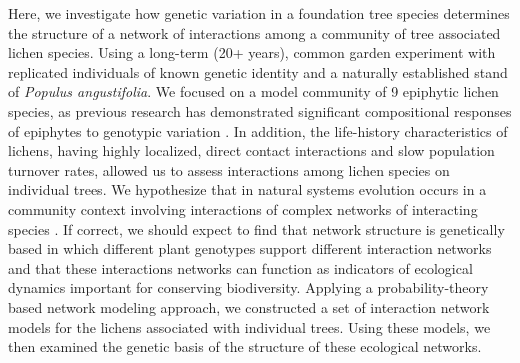 \documentclass[11pt,twocolumn,twoside,lineno]{pnas-new}
\begin{document}
Here, we investigate how genetic variation in a foundation tree
species determines the structure of a network of interactions among a
community of tree associated lichen species. Using a long-term (20+
years), common garden experiment with replicated individuals of known
genetic identity and a naturally established stand of \textit{Populus
  angustifolia}. We focused on a model community of 9 epiphytic lichen
species, as previous research has demonstrated significant
compositional responses of epiphytes to genotypic variation
\cite{Winfree2011, Zytynska2011}. In addition, the life-history
characteristics of lichens, having highly localized, direct contact
interactions and slow population turnover rates, allowed us to assess
interactions among lichen species on individual trees. We hypothesize
that in natural systems evolution occurs in a community context
involving interactions of complex networks of interacting species
\cite{Lau2015a, Keith2017, Thompson2013, Bascompte2006}.  If correct,
we should expect to find that network structure is genetically based
in which different plant genotypes support different interaction
networks and that these interactions networks can function as
indicators of ecological dynamics important for conserving
biodiversity.  Applying a probability-theory based network modeling
approach, we constructed a set of interaction network models for the
lichens associated with individual trees. Using these models, we then
examined the genetic basis of the structure of these ecological
networks.
\end{document}
